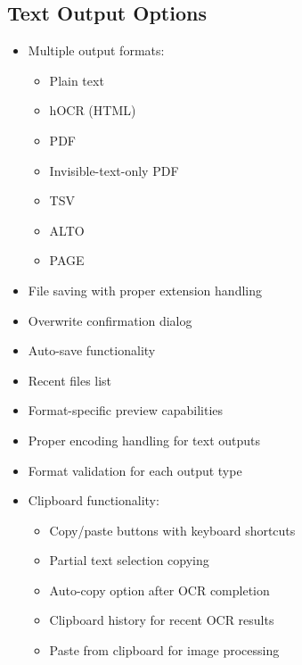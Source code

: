 \documentclass[12pt]{article}
\begin{document}
\subsection{Text Output Options}
\begin{itemize}
    \item Multiple output formats:
    \begin{itemize}
        \item Plain text
        \item hOCR (HTML)
        \item PDF
        \item Invisible-text-only PDF
        \item TSV
        \item ALTO
        \item PAGE
    \end{itemize}
    \item File saving with proper extension handling
    \item Overwrite confirmation dialog
    \item Auto-save functionality
    \item Recent files list
    \item Format-specific preview capabilities
    \item Proper encoding handling for text outputs
    \item Format validation for each output type
    \item Clipboard functionality:
    \begin{itemize}
        \item Copy/paste buttons with keyboard shortcuts
        \item Partial text selection copying
        \item Auto-copy option after OCR completion
        \item Clipboard history for recent OCR results
        \item Paste from clipboard for image processing
    \end{itemize}
\end{itemize}
\end{document}
